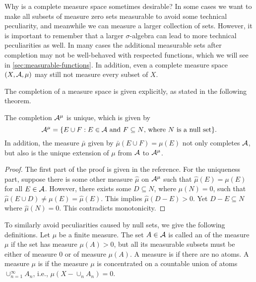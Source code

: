 Why is a complete measure space sometimes desirable? In some cases we want to make all subsets of measure zero sets measurable to avoid some technical peculiarity, and meanwhile we can measure a larger collection of sets. However, it is important to remember that a larger $\sigma$-algebra can lead to more technical peculiarities as well. In many cases the additional measurable sets after completion may not be well-behaved with respected functions, which we will see in \cref{sec:measurable-functions}. In addition, even a complete measure space $(X,\mathcal{A},\mu)$ may still not measure every subset of $X$.

The completion of a measure space is given explicitly, as stated in the following theorem.

\begin{thm}
    The completion $\mathcal{A}^\mu$ is unique, which is given by \[
        \mathcal{A}^\mu =\{E\cup F:E\in\mathcal{A}\text{ and }F\subseteq N\text{, where }N\text{ is a null set}\}.
    \]
    In addition, the measure $\bar{\mu}$ given by $\bar{\mu}(E\cup F)=\mu(E)$ not only completes $\mathcal{A}$, but also is the unique extension of $\mu$ from $\mathcal{A}$ to $\mathcal{A}^\mu$.
\end{thm}
\begin{proof}
    The first part of the proof is given in the reference. For the uniqueness part, suppose there is some other measure $\hat{\mu}$ on $\mathcal{A}^\mu$ such that $\hat{\mu}(E) = \mu(E)$ for all $E \in \mathcal{A}$. However, there exists some $D \subseteq N$, where $\mu(N) = 0$, such that $\hat{\mu}(E \cup D) \neq \mu(E) = \hat{\mu}(E)$. This implies $\hat{\mu}(D - E) > 0$. Yet $D - E \subseteq N$ where $\hat{\mu}(N) = 0$. This contradicts monotonicity.
\end{proof}

To similarly avoid peculiarities caused by null sets, we give the following definitions. Let $\mu$ be a finite measure. The set $A \in \mathcal{A}$ is called an  of the measure $\mu$ if the set has measure $\mu(A) > 0$, but all its measurable subsets must be either of measure $0$ or of measure $\mu(A)$. A measure is  if there are no atoms. A measure $\mu$ is  if the measure $\mu$ is concentrated on a countable union of atoms $\cup_{n=1}^\infty A_n$, i.e., $\mu(X - \cup_n A_n) = 0$.

